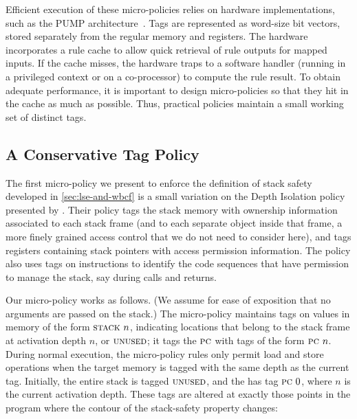\documentclass[acmsmall,review,anonymous]{acmart}\settopmatter{printfolios=true,printccs=false,printacmref=false}
\begin{document}
Efficient execution of these micro-policies relies on hardware implementations,
such as the PUMP architecture~\citep{pump:asplos2015}.  Tags are represented
as word-size bit vectors, stored separately from the regular memory and registers.
The hardware incorporates a rule cache
to allow quick retrieval of rule outputs for mapped inputs. If the cache misses,
the hardware traps to a software handler (running in a privileged context or
on a co-processor) to compute the rule result. To obtain adequate performance,
it is important to design micro-policies so that they hit in the cache as
much as possible. Thus, practical policies maintain a small working set of
distinct tags.

\subsection{A Conservative Tag Policy}
\label{sec:conservative}


The first micro-policy we present to enforce the definition of stack
safety developed in \cref{sec:lse-and-wbcf} is a small variation
on the Depth Isolation policy presented by
\citet{DBLP:conf/sp/RoesslerD18}. Their policy tags the stack memory
with ownership information associated to each stack frame (and to each
separate object inside that frame, a more finely grained access
control that we do not need to consider here), and tags registers containing
stack pointers with access permission information. The policy also
uses tags on instructions to identify the code
sequences that have permission to manage the stack, say during calls and returns.

Our micro-policy works as follows. (We assume for ease of exposition that no
arguments are passed on the stack.)
The micro-policy maintains tags on values in memory of the form $\textsc{stack} ~ n$,
indicating locations that belong to the stack frame at activation depth $n$,
or $\textsc{unused}$; it tags the $\textsc{pc}$ with tags of the form $\textsc{pc} ~ n$.
During normal execution, the micro-policy rules only permit load and store operations
when the target memory is tagged with the same depth as the current {\PCname} tag.
Initially, the entire stack is tagged $\textsc{unused}$,
and the {\PCname} has tag $\textsc{pc} ~ 0$, where $n$ is the current activation depth.
These tags are altered
at exactly those points in
the program where the contour of the stack-safety property changes:
\end{document}
